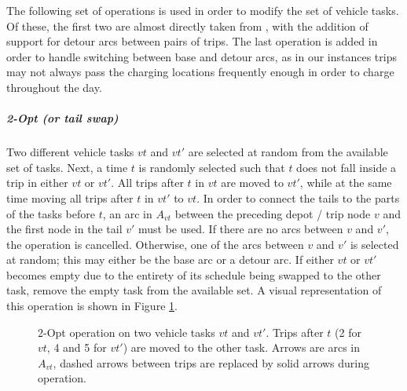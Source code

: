 \documentclass[]{article}
\begin{document}
The following set of operations is used in order to modify the set of vehicle tasks. Of these, the first two are almost directly taken from \citet{Bosch21}, with the addition of support for detour arcs between pairs of trips. The last operation is added in order to handle switching between base and detour arcs, as in our instances trips may not always pass the charging locations frequently enough in order to charge throughout the day.

\noindent\subparagraph{2-Opt (or tail swap)}  Two different vehicle tasks $vt$ and $vt'$ are selected at random from the available set of tasks. Next, a time $t$ is randomly selected such that $t$ does not fall inside a trip in either $vt$ or $vt'$. All trips after $t$ in $vt$ are moved to $vt'$, while at the same time moving all trips after $t$ in $vt'$ to $vt$. In order to connect the tails to the parts of the tasks before $t$, an arc in $A_{vt}$ between the preceding depot / trip node $v$ and the first node in the tail $v'$ must be used. If there are no arcs between $v$ and $v'$, the operation is cancelled. Otherwise, one of the arcs between $v$ and $v'$ is selected at random; this may either be the base arc or a detour arc. If either $vt$ or $vt'$ becomes empty due to the entirety of its schedule being swapped to the other task, remove the empty task from the available set. A visual representation of this operation is shown in Figure \ref{fig:2opt-vt}.
\begin{figure}[H]
  \centering
  \caption{2-Opt operation on two vehicle tasks $vt$ and $vt'$. Trips after $t$ (2 for $vt$, 4 and 5 for $vt'$) are moved to the other task. Arrows are arcs in $A_{vt}$, dashed arrows between trips are replaced by solid arrows during operation.}
  \label{fig:2opt-vt}
\end{figure}
\end{document}
